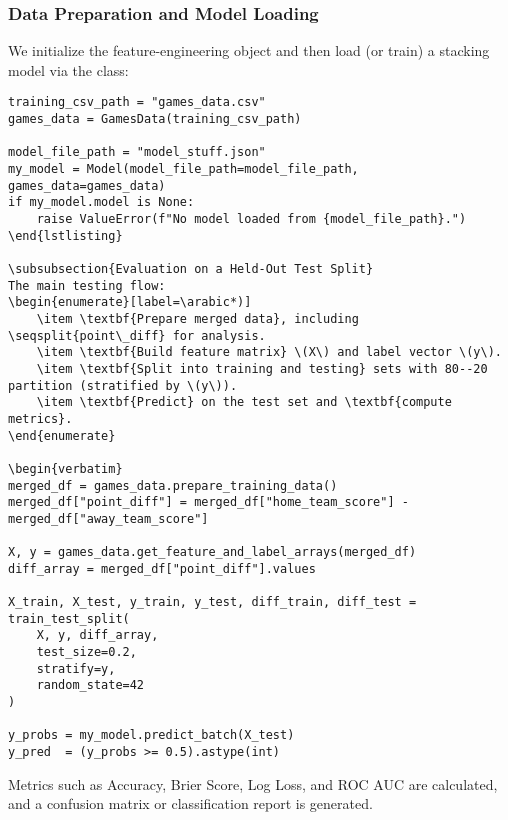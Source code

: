 \documentclass[12pt]{article}
\begin{document}
\subsubsection{Data Preparation and Model Loading}
We initialize the feature-engineering object  and then load (or train) a stacking model via the  class:
\begin{verbatim}
training_csv_path = "games_data.csv"
games_data = GamesData(training_csv_path)

model_file_path = "model_stuff.json"
my_model = Model(model_file_path=model_file_path, games_data=games_data)
if my_model.model is None:
    raise ValueError(f"No model loaded from {model_file_path}.")
\end{lstlisting}

\subsubsection{Evaluation on a Held-Out Test Split}
The main testing flow:
\begin{enumerate}[label=\arabic*)]
    \item \textbf{Prepare merged data}, including \seqsplit{point\_diff} for analysis.
    \item \textbf{Build feature matrix} \(X\) and label vector \(y\).
    \item \textbf{Split into training and testing} sets with 80--20 partition (stratified by \(y\)).
    \item \textbf{Predict} on the test set and \textbf{compute metrics}.
\end{enumerate}

\begin{verbatim}
merged_df = games_data.prepare_training_data()
merged_df["point_diff"] = merged_df["home_team_score"] - merged_df["away_team_score"]

X, y = games_data.get_feature_and_label_arrays(merged_df)
diff_array = merged_df["point_diff"].values

X_train, X_test, y_train, y_test, diff_train, diff_test = train_test_split(
    X, y, diff_array,
    test_size=0.2,
    stratify=y,
    random_state=42
)

y_probs = my_model.predict_batch(X_test)
y_pred  = (y_probs >= 0.5).astype(int)
\end{verbatim}

\noindent
Metrics such as Accuracy, Brier Score, Log Loss, and ROC AUC are calculated, and a confusion matrix or classification report is generated.
\end{document}
